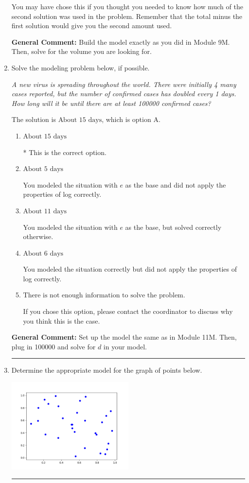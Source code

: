 \documentclass{extbook}[14pt]
\newcommand{\litem}[1]{\item #1

\rule{\textwidth}{0.4pt}}
\begin{document}
\begin{enumerate}
{\begin{enumerate}[label=\Alph*.]
You may have chose this if you thought you needed to know how much of the second solution was used in the problem. Remember that the total minus the first solution would give you the second amount used.
\end{enumerate}

\textbf{General Comment:} Build the model exactly as you did in Module 9M. Then, solve for the volume you are looking for.
}
\litem{
Solve the modeling problem below, if possible.

\begin{center}
    \textit{ A new virus is spreading throughout the world. There were initially 4 many cases reported, but the number of confirmed cases has doubled every 1 days. How long will it be until there are at least 100000 confirmed cases? }
\end{center}
The solution is \( \text{About } 15 \text{ days} \), which is option A.\begin{enumerate}[label=\Alph*.]
\item \( \text{About } 15 \text{ days} \)

* This is the correct option.
\item \( \text{About } 5 \text{ days} \)

You modeled the situation with $e$ as the base and did not apply the properties of log correctly.
\item \( \text{About } 11 \text{ days} \)

You modeled the situation with $e$ as the base, but solved correctly otherwise.
\item \( \text{About } 6 \text{ days} \)

You modeled the situation correctly but did not apply the properties of log correctly.
\item \( \text{There is not enough information to solve the problem.} \)

If you chose this option, please contact the coordinator to discuss why you think this is the case.
\end{enumerate}

\textbf{General Comment:} Set up the model the same as in Module 11M. Then, plug in 100000 and solve for $d$ in your model.
}
\litem{
Determine the appropriate model for the graph of points below.

\begin{center}
    \includegraphics[width=0.5\textwidth]{../Figures/identifyModelGraph12C.png}
\end{center}


}
\end{enumerate}
\end{document}
